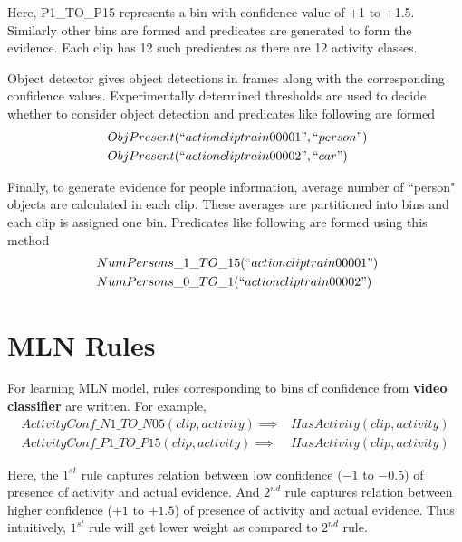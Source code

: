Here, P1\_TO\_P15 represents a bin with confidence value of +1 to +1.5.
Similarly other bins are formed and predicates are generated to form the evidence.
Each clip has 12 such predicates as there are 12 activity classes.

Object detector \cite{voc-release4} gives object detections in frames
along with the corresponding confidence values. Experimentally determined thresholds
are used to decide whether to consider object detection and predicates like following are formed
\begin{equation}
	\begin{split}
		~ & ObjPresent(``actioncliptrain00001",``person") \\
		~ & ObjPresent(``actioncliptrain00002",``car")
	\end{split}
\end{equation}

Finally, to generate evidence for people information, average number of ``person"
objects are calculated in each clip. These averages are partitioned into bins
and each clip is assigned one bin. Predicates like following are formed using this method
\begin{equation}
	\begin{split}
		~ & NumPersons\_1\_TO\_15(``actioncliptrain00001") \\
		~ & NumPersons\_0\_TO\_1(``actioncliptrain00002")
	\end{split}
\end{equation}





\section{MLN Rules}
For learning MLN model, rules corresponding to bins of confidence
from {\bf video classifier} are written.
For example,
\begin{equation}
	\begin{split}
		ActivityConf\_N1\_TO\_N05(clip,activity) \implies & HasActivity(clip,activity) \\
		ActivityConf\_P1\_TO\_P15(clip,activity) \implies & HasActivity(clip,activity)
	\end{split}
\end{equation}

Here, the $1^{st}$ rule captures relation between low confidence ($-1$ to $-0.5$) of presence
of activity and actual evidence. And $2^{nd}$ rule captures relation between
higher confidence ($+1$ to $+1.5$) of presence of activity and actual evidence.
Thus intuitively, $1^{st}$ rule will get lower weight as compared to $2^{nd}$ rule.

